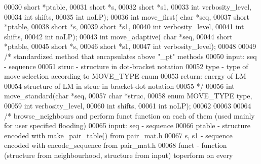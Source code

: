\begin{DoxyCode}
00030                   \textcolor{keywordtype}{short} *ptable,
00031                   \textcolor{keywordtype}{short} *s,
00032                   \textcolor{keywordtype}{short} *s1,
00033                   \textcolor{keywordtype}{int} verbosity\_level,
00034                   \textcolor{keywordtype}{int} shifts,
00035                   \textcolor{keywordtype}{int} noLP);
00036 \textcolor{keywordtype}{int} move\_first( \textcolor{keywordtype}{char} *seq,
00037                 \textcolor{keywordtype}{short} *ptable,
00038                 \textcolor{keywordtype}{short} *s,
00039                 \textcolor{keywordtype}{short} *s1,
00040                 \textcolor{keywordtype}{int} verbosity\_level,
00041                 \textcolor{keywordtype}{int} shifts,
00042                 \textcolor{keywordtype}{int} noLP);
00043 \textcolor{keywordtype}{int} move\_adaptive(  \textcolor{keywordtype}{char} *seq,
00044                 \textcolor{keywordtype}{short} *ptable,
00045                 \textcolor{keywordtype}{short} *s,
00046                 \textcolor{keywordtype}{short} *s1,
00047                 \textcolor{keywordtype}{int} verbosity\_level);
00048 
00049 \textcolor{comment}{/* standardized method that encapsulates above "\_pt" methods}
00050 \textcolor{comment}{  input:  seq - sequence}
00051 \textcolor{comment}{          struc - structure in dot-bracket notation}
00052 \textcolor{comment}{          type - type of move selection according to MOVE\_TYPE enum}
00053 \textcolor{comment}{  return: energy of LM}
00054 \textcolor{comment}{          structure of LM in struc in bracket-dot notation}
00055 \textcolor{comment}{*/}
00056 \textcolor{keywordtype}{int} move\_standard(\textcolor{keywordtype}{char} *seq,
00057                   \textcolor{keywordtype}{char} *struc,
00058                   \textcolor{keyword}{enum} MOVE\_TYPE type,
00059                   \textcolor{keywordtype}{int} verbosity\_level,
00060                   \textcolor{keywordtype}{int} shifts,
00061                   \textcolor{keywordtype}{int} noLP);
00062 
00063 
00064 \textcolor{comment}{/* browse\_neighbours and perform funct function on each of them (used mainly for user specified flooding)}
00065 \textcolor{comment}{    input:    seq - sequence}
00066 \textcolor{comment}{              ptable - structure encoded with make\_pair\_table() from pair\_mat.h}
00067 \textcolor{comment}{              s, s1 - sequence encoded with encode\_sequence from pair\_mat.h}
00068 \textcolor{comment}{              funct - function (structure from neighbourhood, structure from input) toperform on every
}
\end{DoxyCode}
